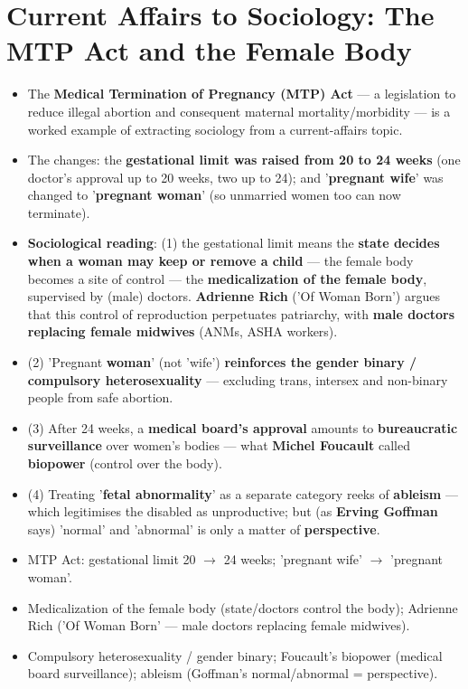 \section{Current Affairs  to  Sociology: The MTP Act and the Female Body}

\begin{ExampleBox}
\begin{itemize}
\item The \textbf{Medical Termination of Pregnancy (MTP) Act} --- a legislation to reduce illegal abortion and consequent maternal mortality/morbidity --- is a worked example of extracting sociology from a current-affairs topic.
\item The changes: the \textbf{gestational limit was raised from 20 to 24 weeks} (one doctor's approval up to 20 weeks, two up to 24); and '\textbf{pregnant wife}' was changed to '\textbf{pregnant woman}' (so unmarried women too can now terminate).
\item \textbf{Sociological reading}: (1) the gestational limit means the \textbf{state decides when a woman may keep or remove a child} --- the female body becomes a site of control --- the \textbf{medicalization of the female body}, supervised by (male) doctors. \textbf{Adrienne Rich} ('Of Woman Born') argues that this control of reproduction perpetuates patriarchy, with \textbf{male doctors replacing female midwives} (ANMs, ASHA workers).
\item (2) 'Pregnant \textbf{woman}' (not 'wife') \textbf{reinforces the gender binary / compulsory heterosexuality} --- excluding trans, intersex and non-binary people from safe abortion.
\item (3) After 24 weeks, a \textbf{medical board's approval} amounts to \textbf{bureaucratic surveillance} over women's bodies --- what \textbf{Michel Foucault} called \textbf{biopower} (control over the body).
\item (4) Treating '\textbf{fetal abnormality}' as a separate category reeks of \textbf{ableism} --- which legitimises the disabled as unproductive; but (as \textbf{Erving Goffman} says) 'normal' and 'abnormal' is only a matter of \textbf{perspective}.
\end{itemize}
\end{ExampleBox}

\begin{QuickRevision}
\begin{itemize}
\item MTP Act: gestational limit 20 $\rightarrow$ 24 weeks; 'pregnant wife' $\rightarrow$ 'pregnant woman'.
\item Medicalization of the female body (state/doctors control the body); Adrienne Rich ('Of Woman Born' --- male doctors replacing female midwives).
\item Compulsory heterosexuality / gender binary; Foucault's biopower (medical board surveillance); ableism (Goffman's normal/abnormal = perspective).
\end{itemize}
\end{QuickRevision}

